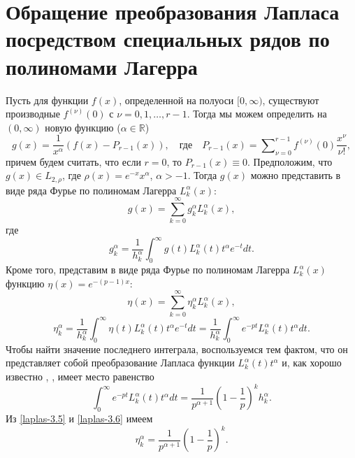 \section{Обращение преобразования Лапласа посредством специальных рядов по полиномами Лагерра}
Пусть для функции $f(x)$, определенной на полуоси $[0,\infty)$, существуют производные $f^{(\nu)}(0)$ с $\nu=0,1,\ldots, r-1$. Тогда мы можем определить на $(0,\infty)$  новую функцию ($\alpha\in\mathbb{R}$)
\begin{equation}\label{laplas-3.1}
g(x)=\frac{1}{x^\alpha}(f(x)-P_{r-1}(x)),\quad \text{где} \quad P_{r-1}(x)=\sum\nolimits_{\nu=0}^{r-1}f^{(\nu)}(0)\frac{x^\nu}{\nu!},
\end{equation}
причем будем считать, что если $r=0$, то $P_{r-1}(x)\equiv0$. Предположим, что $g(x)\in L_{2,\rho}$, где $\rho(x)=e^{-x}x^\alpha$, $\alpha>-1$.
Тогда  $g(x)$ можно представить в виде ряда Фурье по  полиномам Лагерра $L_k^\alpha(x)$:
\begin{equation}\label{laplas-3.2}
g(x)=\sum_{k=0}^{\infty} g_k^\alpha L_k^\alpha(x),
\end{equation}
где
\begin{equation}\label{laplas-3.3}
 g_k^\alpha=\frac{1}{h_k^\alpha} \int_0^\infty g(t) L_k^\alpha(t)t^\alpha e^{-t}dt.
\end{equation}
Кроме того, представим в виде ряда Фурье по полиномам Лагерра $L_k^\alpha(x)$  функцию $\eta(x)=e^{-(p-1)x}$:
\begin{equation}\label{laplas-3.4}
\eta(x)=\sum_{k=0}^{\infty} \eta_k^\alpha L_k^\alpha(x),
\end{equation}
\begin{equation}\label{laplas-3.5}
 \eta_k^\alpha=\frac{1}{h_k^\alpha} \int_0^\infty \eta(t) L_k^\alpha(t)t^\alpha e^{-t}dt=\frac{1}{h_k^\alpha} \int_0^\infty e^{-pt}L_k^\alpha(t)t^\alpha dt.
\end{equation}
Чтобы найти значение последнего интеграла, воспользуемся тем фактом, что он представляет собой преобразование Лапласа функции
$L_k^\alpha(t)t^\alpha$ и, как хорошо известно \cite{laplas-DitPrud}, \cite{laplas-KrylovSkob}, имеет место равенство
\begin{equation}\label{laplas-3.6}
  \int_0^\infty e^{-pt}L_k^\alpha(t)t^\alpha dt=\frac{1}{p^{\alpha+1}}\left(1-\frac1p\right)^kh_k^\alpha.
\end{equation}
Из \eqref{laplas-3.5} и \eqref{laplas-3.6} имеем
\begin{equation}\label{laplas-3.7}
 \eta_k^\alpha=\frac{1}{p^{\alpha+1}}\left(1-\frac1p\right)^k.
\end{equation}
